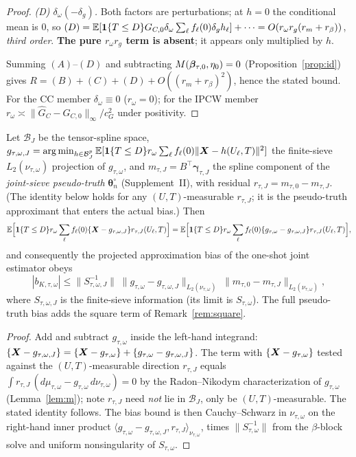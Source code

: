 \begin{proof}
\emph{(D) $\delta_\omega(-\delta_g)$.} Both factors are perturbations; at $h=0$
the conditional mean is $0$, so
$(D)=\mathbb{E}[\mathbf{1}\{T\le D\}G_{C,0}\delta_\omega\sum_\ell f_\ell(0)\delta_g h_\ell]+\cdots
=O(r_\omega r_g(r_m+r_\beta))$, \emph{third order}. \textbf{The pure $r_\omega
r_g$ term is absent}; it appears only multiplied by $h$.

Summing $(A)$--$(D)$ and subtracting $M(\bm{\beta}_{\tau,0},\eta_0)=0$
(Proposition~\ref{prop:id}) gives $R=(B)+(C)+(D)+O((r_m+r_\beta)^2)$, hence the
stated bound. For the CC member $\delta_\omega\equiv0$ ($r_\omega=0$); for the
IPCW member $r_\omega\asymp\|\widehat G_C-G_{C,0}\|_\infty/c_G^2$ under positivity.
\end{proof}

\begin{proposition}\label{prop:bias}
Let $\mathcal B_J$ be the tensor-spline space, $g_{\tau,\omega,J}=\operatorname*{arg\,min}_{h\in
\mathcal B_J^p}\mathbb{E}[\mathbf{1}\{T\le D\}r_{\omega}\sum_\ell f_\ell(0)\|\bm{X}-h(U_\ell,T)\|^2]$ the
finite-sieve $L_2(\nu_{\tau,\omega})$ projection of $g_{\tau,\omega}$, and
$m_{\tau,J}=B^\top\bm\gamma_{\tau,J}$ the spline component of the
\emph{joint-sieve pseudo-truth} $\bm\theta_n^\circ$ (Supplement~II), with residual
$r_{\tau,J}=m_{\tau,0}-m_{\tau,J}$. (The identity below holds for any
$(U,T)$-measurable $r_{\tau,J}$; it is the pseudo-truth approximant that enters
the actual bias.) Then
\[
\mathbb{E}\Big[\mathbf{1}\{T\le D\}r_{\omega}\sum_\ell f_\ell(0)\{\bm{X}-g_{\tau,\omega,J}\}
   r_{\tau,J}(U_\ell,T)\Big]
=\mathbb{E}\Big[\mathbf{1}\{T\le D\}r_{\omega}\sum_\ell f_\ell(0)\{g_{\tau,\omega}-g_{\tau,\omega,J}\}
   r_{\tau,J}(U_\ell,T)\Big],
\]
and consequently the projected approximation bias of the one-shot joint estimator
obeys
\[
|b_{K,\tau,\omega}|\le\|S_{\tau,\omega,J}^{-1}\|\;
\|g_{\tau,\omega}-g_{\tau,\omega,J}\|_{L_2(\nu_{\tau,\omega})}\;
\|m_{\tau,0}-m_{\tau,J}\|_{L_2(\nu_{\tau,\omega})},
\]
where $S_{\tau,\omega,J}$ is the finite-sieve information (its limit is
$S_{\tau,\omega}$). The full pseudo-truth bias adds the square term of
Remark~\ref{rem:square}.
\end{proposition}
\begin{proof}
Add and subtract $g_{\tau,\omega}$ inside the left-hand integrand:
$\{\bm{X}-g_{\tau,\omega,J}\}=\{\bm{X}-g_{\tau,\omega}\}+\{g_{\tau,\omega}
-g_{\tau,\omega,J}\}$. The term with $\{\bm{X}-g_{\tau,\omega}\}$ tested against the
$(U,T)$-measurable direction $r_{\tau,J}$ equals $\int r_{\tau,J}\,
(d\mu_{\tau,\omega}-g_{\tau,\omega}\,d\nu_{\tau,\omega})=0$ by the
Radon--Nikodym characterization of $g_{\tau,\omega}$ (Lemma~\ref{lem:m}); note
$r_{\tau,J}$ need \emph{not} lie in $\mathcal B_J$, only be $(U,T)$-measurable.
The stated identity follows. The bias bound is then Cauchy--Schwarz in
$\nu_{\tau,\omega}$ on the right-hand inner product
$\langle g_{\tau,\omega}-g_{\tau,\omega,J},r_{\tau,J}\rangle_{\nu_{\tau,\omega}}$,
times $\|S_{\tau,\omega}^{-1}\|$ from the $\beta$-block solve and uniform
nonsingularity of $S_{\tau,\omega}$.
\end{proof}


